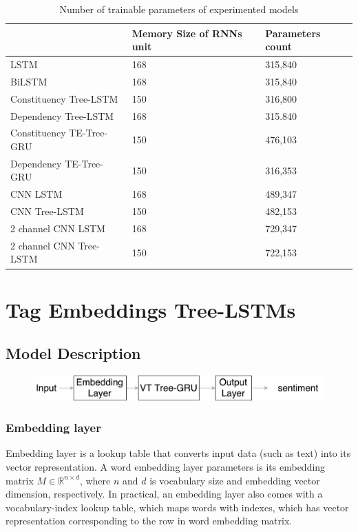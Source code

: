 \begin{table}[H]
    \centering
    \caption{Number of trainable parameters of experimented models}
    \label{table:paramtable}
    \begin{tabular}{lll}
        ~ & Memory Size of RNNs unit & Parameters count \\ \hline
        LSTM                     & 168         & 315,840          \\
        BiLSTM                   & 168         & 315,840          \\
        Constituency Tree-LSTM   & 150         & 316,800          \\
        Dependency Tree-LSTM     & 168         & 315.840          \\
        Constituency TE-Tree-GRU & 150         & 476,103          \\
        Dependency TE-Tree-GRU   & 150         & 316,353          \\
        CNN LSTM                 & 168         & 489,347          \\
        CNN Tree-LSTM            & 150         & 482,153          \\
        2 channel CNN LSTM       & 168         & 729,347          \\
        2 channel CNN Tree-LSTM  & 150         & 722,153         
    \end{tabular}
\end{table}

\hypertarget{sec:VTtree}{\section{Tag Embeddings Tree-LSTMs}}\label{sec:VTtree}
\subsection{Model Description}

\begin{figure}[H]
    \centering
    \includegraphics[width=0.8\linewidth]{figure/vtgrusummary.pdf}
    \caption[]{}
    \label{fig:vtgrusummary}
\end{figure}

\subsubsection{Embedding layer}\label{sec:embedding}
Embedding layer is a lookup table that converts input data (such as text) into its vector representation. A word embedding layer parameters is its embedding matrix $M  \in \mathbb{R}^{n \times d}$, where $n$ and $d$ is vocabulary size and embedding vector dimension, respectively. In practical, an embedding layer also comes with a vocabulary-index lookup table, which maps words with indexes, which has vector representation corresponding to the row in word embedding matrix.
  
